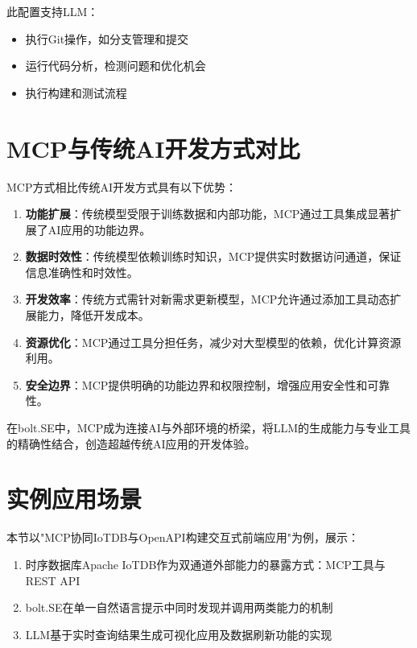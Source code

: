 此配置支持LLM：
\begin{itemize}
  \item 执行Git操作，如分支管理和提交
  \item 运行代码分析，检测问题和优化机会
  \item 执行构建和测试流程
\end{itemize}

\section{MCP与传统AI开发方式对比}

MCP方式相比传统AI开发方式具有以下优势：

\begin{enumerate}
  \item \textbf{功能扩展}：传统模型受限于训练数据和内部功能，MCP通过工具集成显著扩展了AI应用的功能边界。

  \item \textbf{数据时效性}：传统模型依赖训练时知识，MCP提供实时数据访问通道，保证信息准确性和时效性。

  \item \textbf{开发效率}：传统方式需针对新需求更新模型，MCP允许通过添加工具动态扩展能力，降低开发成本。

  \item \textbf{资源优化}：MCP通过工具分担任务，减少对大型模型的依赖，优化计算资源利用。

  \item \textbf{安全边界}：MCP提供明确的功能边界和权限控制，增强应用安全性和可靠性。
\end{enumerate}

在bolt.SE中，MCP成为连接AI与外部环境的桥梁，将LLM的生成能力与专业工具的精确性结合，创造超越传统AI应用的开发体验。

\section{实例应用场景}
\label{sec:mcp-iotdb-demo}

本节以"MCP协同IoTDB与OpenAPI构建交互式前端应用"为例，展示：
\begin{enumerate}
  \item 时序数据库Apache IoTDB作为双通道外部能力的暴露方式：MCP工具与REST API
  \item bolt.SE在单一自然语言提示中同时发现并调用两类能力的机制
  \item LLM基于实时查询结果生成可视化应用及数据刷新功能的实现
\end{enumerate}

